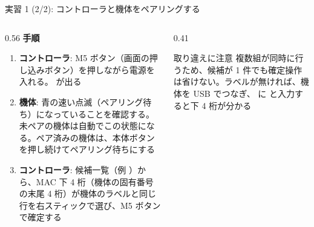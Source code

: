 \begin{frame}[fragile]{実習 1 (2/2): コントローラと機体をペアリングする}
  \begin{columns}[T]
    \begin{column}{0.56\textwidth}
      {\footnotesize\textbf{\textcolor{sfblue}{手順}}}\par\vspace{-2pt}
      \footnotesize
      \begin{enumerate}\setlength{\itemsep}{1pt}
        \item \textbf{コントローラ}: M5 ボタン（画面の押し込みボタン）を押しながら電源を入れる。 が出る
        \item \textbf{機体}: 青の速い点滅（ペアリング待ち）になっていることを確認する。未ペアの機体は自動でこの状態になる。ペア済みの機体は、本体ボタンを押し続けてペアリング待ちにする
        \item \textbf{コントローラ}: 候補一覧（例 ）から、MAC 下 4 桁（機体の固有番号の末尾 4 桁）が機体のラベルと同じ行を右スティックで選び、M5 ボタンで確定する
      \end{enumerate}
    \end{column}
    \begin{column}{0.41\textwidth}
      \begin{alertblock}{取り違えに注意}
        \scriptsize 複数組が同時に行うため、候補が 1 件でも確定操作は省けない。ラベルが無ければ、機体を USB でつなぎ、 に  と入力すると下 4 桁が分かる
      \end{alertblock}
    \end{column}
  \end{columns}
\end{frame}

